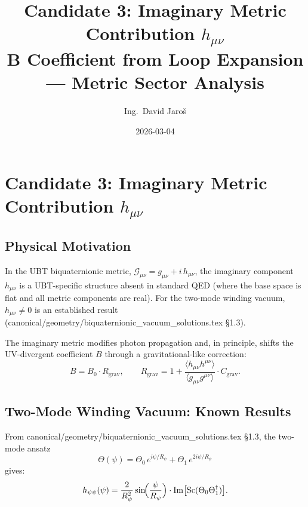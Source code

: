 \documentclass[11pt,a4paper]{article}
\title{Candidate 3: Imaginary Metric Contribution \texorpdfstring{$h_{\mu\nu}$}{h\_munu}\\
    \large B Coefficient from Loop Expansion — Metric Sector Analysis}
\author{Ing.\ David Jaroš}
\date{2026-03-04}
\theoremstyle{remark}
\begin{document}
  \maketitle
\fi

\section{Candidate 3: Imaginary Metric Contribution
  \texorpdfstring{$h_{\mu\nu}$}{h\_munu}}
\label{sec:candidate3_metric}

\subsection{Physical Motivation}

In the UBT biquaternionic metric,
$\mathcal{G}_{\mu\nu} = g_{\mu\nu} + i\,h_{\mu\nu}$,
the imaginary component $h_{\mu\nu}$ is a UBT-specific structure absent in standard QED
(where the base space is flat and all metric components are real). For the two-mode winding
vacuum, $h_{\mu\nu} \neq 0$ is an established result
(canonical/geometry/biquaternionic\_vacuum\_solutions.tex \S1.3).

The imaginary metric modifies photon propagation and, in principle, shifts the UV-divergent
coefficient $B$ through a gravitational-like correction:
\begin{equation}
  B = B_0 \cdot R_{\mathrm{grav}}, \qquad
  R_{\mathrm{grav}} = 1 + \frac{\langle h_{\mu\nu}h^{\mu\nu}\rangle}{\langle g_{\mu\nu}g^{\mu\nu}\rangle}
    \cdot C_{\mathrm{grav}}.
  \label{eq:R_grav}
\end{equation}

\subsection{Two-Mode Winding Vacuum: Known Results}

From canonical/geometry/biquaternionic\_vacuum\_solutions.tex \S1.3, the two-mode ansatz
\begin{equation}
  \Theta(\psi) = \Theta_0\,e^{i\psi/R_\psi} + \Theta_1\,e^{2i\psi/R_\psi}
  \label{eq:two_mode}
\end{equation}
gives:
\begin{equation}
  h_{\psi\psi}(\psi) = \frac{2}{R_\psi^2}\sin\!\Bigl(\frac{\psi}{R_\psi}\Bigr)
    \cdot \mathrm{Im}\bigl[\mathrm{Sc}(\Theta_0\Theta_1^\dagger)\bigr].
  \label{eq:h_psi_psi_C3}
\end{equation}
\end{document}
